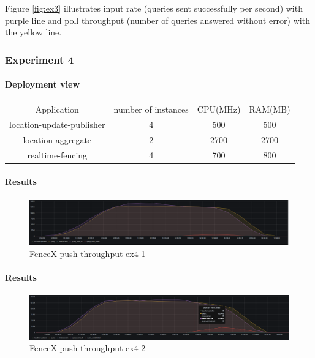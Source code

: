 \documentclass[a4]{report}
\begin{document}
    Figure \ref{fig:ex3} illustrates input rate (queries sent successfully per second) with purple line and poll
    throughput (number of queries answered without error) with the yellow line.

    \subsubsection{Experiment 4}

    \paragraph{Deployment view}
    \begin{center}
        \begin{tabular}{ c c c c }
            Application               & number of instances & CPU(MHz) & RAM(MB) \\
            location-update-publisher & 4                   & 500      & 500     \\
            location-aggregate        & 2                   & 2700     & 2700    \\
            realtime-fencing          & 4                   & 700      & 800     \\
        \end{tabular}
    \end{center}

    \paragraph{Results}
    \begin{figure}[ht]
        \caption{FenceX push throughput ex4-1}
        \label{fig:ex4-1}
        \includegraphics[scale=0.4]{images/evaluation/ex4-benchmarking(19,10).png}
    \end{figure}

    \paragraph{Results}
    \begin{figure}[ht]
        \caption{FenceX push throughput ex4-2}
        \label{fig:ex4-2}
        \includegraphics[scale=0.4]{images/evaluation/ex4-benchmarking(22,10).png}
    \end{figure}
\end{document}
